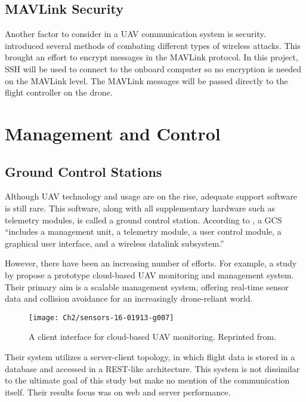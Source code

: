 \subsection{MAVLink Security}
Another factor to consider in a UAV communication system is security.  introduced several methods of combating different types of wireless attacks. This brought an effort to encrypt messages in the MAVLink protocol. In this project, SSH will be used to connect to the onboard computer so no encryption is needed on the MAVLink level. The MAVLink messages will be passed directly to the flight controller on the drone.

\section{Management and Control}
\label{management-and-control}

\subsection{Ground Control Stations}
\label{subsect:gcs}
Although UAV technology and usage are on the rise, adequate support software is still rare. This software, along with all supplementary hardware such as telemetry modules, is called a ground control station. According to , a GCS ``includes a management unit, a telemetry module, a user control module, a graphical user interface, and a wireless datalink subsystem.''

However, there have been an increasing number of efforts. For example, a study by \cite{itkin2016development} propose a prototype cloud-based UAV monitoring and management system. Their primary aim is a scalable management system, offering real-time sensor data and collision avoidance for an increasingly drone-reliant world.

\begin{figure}[t]
	\texttt{[image: Ch2/sensors-16-01913-g007]}
	\caption[Cloud-based UAV monitoring \protect\cite{itkin2016development}.]{A client interface for cloud-based UAV monitoring. Reprinted from\protect{}.}
	\label{fig:clouduav}
\end{figure}
\FloatBarrier

Their system utilizes a server-client topology, in which flight data is stored in a database and accessed in a REST-like architecture. This system is not dissimilar to the ultimate goal of this study but make no mention of the communication itself. Their results focus was on web and server performance.

